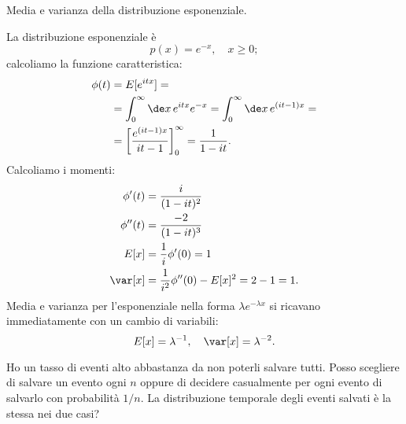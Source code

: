 \begin{exercise}
	Media e varianza della distribuzione esponenziale.
\end{exercise}

\begin{solution}
	La distribuzione esponenziale è
	\begin{equation*}
		p(x) = e^{-x}, \quad x \ge 0;
	\end{equation*}
	calcoliamo la funzione caratteristica:
	\begin{align*}
		\phi(t) &=  E[e^{itx}] = \\
		&= \int_0^\infty \de x\, e^{itx}e^{-x} = \int_0^\infty \de x\, e^{(it-1)x} = \\
		&= \left[ \frac{e^{(it-1)x}}{it-1} \right]_0^\infty = \frac1{1-it}.
	\end{align*}
	Calcoliamo i momenti:
	\begin{align*}
		\phi'(t) &= \frac{i}{(1-it)^2} \\
		\phi''(t) &= \frac{-2}{(1-it)^3} \\
		E[x] &= \frac1i \phi'(0) = 1 \\
		\var[x] &= \frac1{i^2}\phi''(0) - E[x]^2 = 2 - 1 = 1.
	\end{align*}
	Media e varianza per l'esponenziale nella forma $\lambda e^{-\lambda x}$ si ricavano immediatamente con un cambio di variabili:
	\begin{equation*}
		E[x] = \lambda^{-1}, \quad \var[x] = \lambda^{-2}.
	\end{equation*}
\end{solution}

\begin{exercise}
	\label{th:salvexp}
	Ho un tasso di eventi alto abbastanza da non poterli salvare tutti. Posso scegliere di salvare un evento ogni $n$ oppure di decidere casualmente per ogni evento di salvarlo con probabilità $1/n$. La distribuzione temporale degli eventi salvati è la stessa nei due casi?
\end{exercise}

